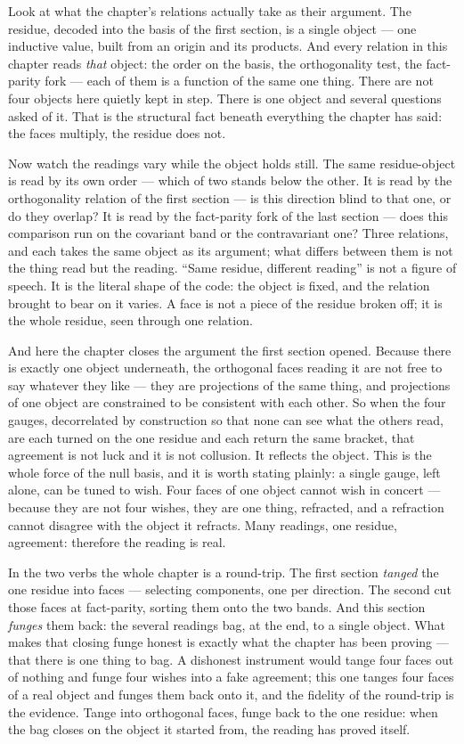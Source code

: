 Look at what the chapter's relations actually take as their argument. The residue, decoded into the basis of the first
section, is a single object --- one inductive value, built from an origin and its products. And every relation in this
chapter reads \emph{that} object: the order on the basis, the orthogonality test, the fact-parity fork --- each of them
is a function of the same one thing. There are not four objects here quietly kept in step. There is one object and
several questions asked of it. That is the structural fact beneath everything the chapter has said: the faces multiply,
the residue does not.

Now watch the readings vary while the object holds still. The same residue-object is read by its own order --- which of
two stands below the other. It is read by the orthogonality relation of the first section --- is this direction blind
to that one, or do they overlap? It is read by the fact-parity fork of the last section --- does this comparison run on
the covariant band or the contravariant one? Three relations, and each takes the same object as its argument; what
differs between them is not the thing read but the reading. ``Same residue, different reading'' is not a figure of
speech. It is the literal shape of the code: the object is fixed, and the relation brought to bear on it varies. A face
is not a piece of the residue broken off; it is the whole residue, seen through one relation.

And here the chapter closes the argument the first section opened. Because there is exactly one object underneath, the
orthogonal faces reading it are not free to say whatever they like --- they are projections of the same thing, and
projections of one object are constrained to be consistent with each other. So when the four gauges, decorrelated by
construction so that none can see what the others read, are each turned on the one residue and each return the same
bracket, that agreement is not luck and it is not collusion. It reflects the object. This is the whole force of the
null basis, and it is worth stating plainly: a single gauge, left alone, can be tuned to wish. Four faces of one object
cannot wish in concert --- because they are not four wishes, they are one thing, refracted, and a refraction cannot
disagree with the object it refracts. Many readings, one residue, agreement: therefore the reading is real.

In the two verbs the whole chapter is a round-trip. The first section \emph{tanged} the one residue into faces ---
selecting components, one per direction. The second cut those faces at fact-parity, sorting them onto the two bands.
And this section \emph{funges} them back: the several readings bag, at the end, to a single object. What makes that
closing funge honest is exactly what the chapter has been proving --- that there is one thing to bag. A dishonest
instrument would tange four faces out of nothing and funge four wishes into a fake agreement; this one tanges four
faces of a real object and funges them back onto it, and the fidelity of the round-trip is the evidence. Tange into
orthogonal faces, funge back to the one residue: when the bag closes on the object it started from, the reading has
proved itself.

